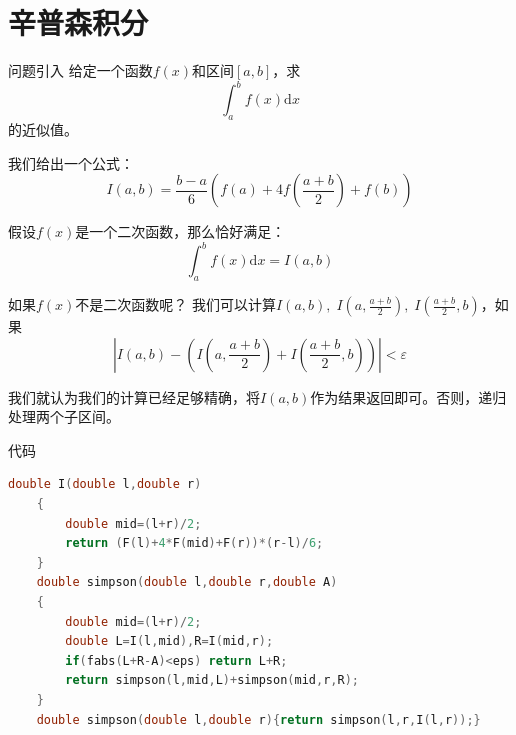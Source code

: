 \documentclass{beamer}
\begin{document}
\section{辛普森积分}

\begin{frame}{问题引入}
    给定一个函数$f(x)$和区间$[a,b]$，求
    \begin{equation*}
        \int_a^b f(x)\text{d}x
    \end{equation*}
    的近似值。
\end{frame}

\begin{frame}
    我们给出一个公式：
    \begin{equation*}
        I(a,b)=\frac{b-a}{6}\left(f(a)+4f\left(\frac{a+b}{2}\right)+f(b)\right)
    \end{equation*}
    
    假设$f(x)$是一个二次函数，那么恰好满足：
    \begin{equation*}
        \int_a^b f(x)\text{d}x=I(a,b)
    \end{equation*}

    如果$f(x)$不是二次函数呢？\pause
    我们可以计算$I(a,b),\;I\left(a,\frac{a+b}{2}\right),\;I\left(\frac{a+b}{2},b\right)$，如果
    \begin{equation*}
        \left|I(a,b)-\left(I\left(a,\frac{a+b}{2}\right)+I\left(\frac{a+b}{2},b\right)\right)\right| < \varepsilon
    \end{equation*}

    我们就认为我们的计算已经足够精确，将$I(a,b)$作为结果返回即可。否则，递归处理两个子区间。
\end{frame}

\begin{frame}[fragile]{代码}
    \begin{minipage}{\linewidth}
    \begin{lstlisting}[language=c++]
    double I(double l,double r)
    {
        double mid=(l+r)/2;
        return (F(l)+4*F(mid)+F(r))*(r-l)/6;
    }
    double simpson(double l,double r,double A)
    {
        double mid=(l+r)/2;
        double L=I(l,mid),R=I(mid,r);
        if(fabs(L+R-A)<eps) return L+R;
        return simpson(l,mid,L)+simpson(mid,r,R);
    }
    double simpson(double l,double r){return simpson(l,r,I(l,r));}
    \end{lstlisting}
    \end{minipage}
\end{frame}
\end{document}
